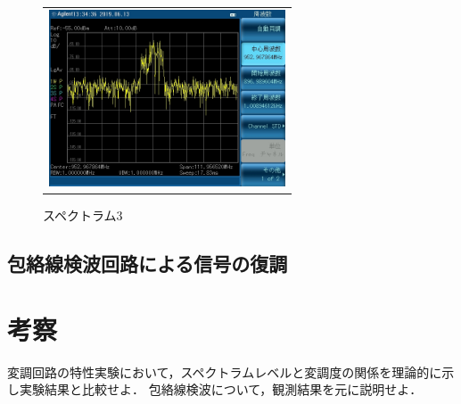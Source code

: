 \begin{figure}[htpb]
\begin{tabular}{c}
    \begin{minipage}{0.50\hsize}
      \centering
      \includegraphics[keepaspectratio, width=7cm]{./img/spectrum_3.JPG}
      \caption{スペクトラム3}
    \end{minipage}
  \end{tabular}
\end{figure}

\subsection{包絡線検波回路による信号の復調}


\newpage
\section{考察}
変調回路の特性実験において，スペクトラムレベルと変調度の関係を理論的に示し実験結果と比較せよ．
包絡線検波について，観測結果を元に説明せよ．


